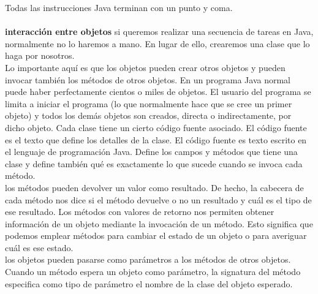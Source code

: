 \documentclass[11pt,a4paper]{article}
\begin{document}
	Todas las instrucciones Java terminan con un punto y coma.\\ \\
	\textbf{interacción entre objetos}
	si queremos realizar una secuencia de tareas en Java, normalmente no lo haremos
	a mano. En lugar de ello, crearemos una clase que lo haga por nosotros.\\
	Lo importante aquí es que los objetos pueden crear otros objetos y pueden invocar también los
	métodos de otros objetos. En un programa Java normal puede haber perfectamente cientos o miles
	de objetos. El usuario del programa se limita a iniciar el programa (lo que normalmente hace que
	se cree un primer objeto) y todos los demás objetos son creados, directa o indirectamente, por
	dicho objeto. Cada clase tiene un cierto código fuente asociado. El código fuente es el texto que define los
	detalles de la clase. El código fuente es texto escrito en el lenguaje de programación Java. Define los campos y métodos
	que tiene una clase y define también qué es exactamente lo que sucede cuando se invoca cada
	método. \\
	los métodos
	pueden devolver un valor como resultado. De hecho, la cabecera de cada método nos dice si el
	método devuelve o no un resultado y cuál es el tipo de ese resultado. Los métodos con valores de retorno nos permiten obtener información de un objeto mediante la
	invocación de un método. Esto significa que podemos emplear métodos para cambiar el estado
	de un objeto o para averiguar cuál es ese estado.\\
	los objetos pueden pasarse como parámetros a los métodos de otros
	objetos. Cuando un método espera un objeto como parámetro, la signatura del método especifica
	como tipo de parámetro el nombre de la clase del objeto esperado.\\
	\\
	
\end{document}
